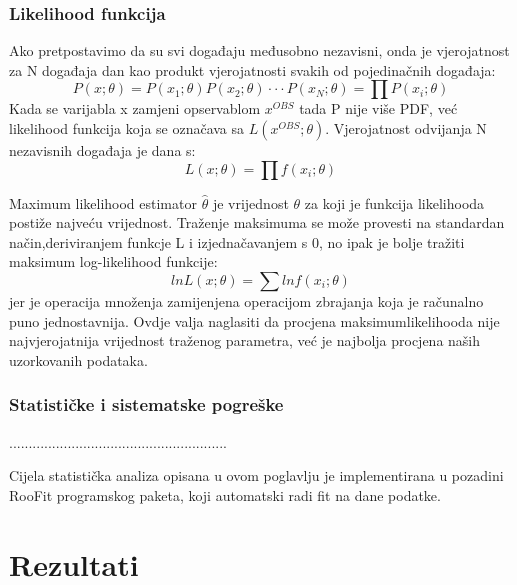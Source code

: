 \documentclass[12pt,a4paper,oneside]{article}
\begin{document}
\begin{linenumbers}
		\subsubsection{Likelihood funkcija}
		Ako pretpostavimo da su svi događaju međusobno nezavisni, onda je vjerojatnost za N događaja dan kao produkt vjerojatnosti svakih od pojedinačnih događaja:
		\begin{equation}
		P(x;\theta) = P(x_1 ; \theta) P(x_2 ; \theta) \cdot \cdot \cdot P(x_N ; \theta) = \prod P(x_i ; \theta)
		\end{equation}
		Kada se varijabla x zamjeni opservablom \begin{math}
		x^{OBS}
		\end{math} tada P nije više PDF, već likelihood funkcija  koja se označava sa \begin{math}
		L (x^{OBS}; \theta)
		\end{math}. Vjerojatnost odvijanja N nezavisnih događaja je dana s:
		\begin{equation}
		L(x; \theta) = \prod f(x_i; \theta)
		\end{equation}
		
		Maximum likelihood estimator \begin{math}
		\hat{\theta}
		\end{math} je vrijednost $\theta$ za koji je funkcija likelihooda postiže najveću vrijednost. Traženje maksimuma se može provesti na standardan način,deriviranjem funkcje L i izjednačavanjem s 0, no ipak je bolje tražiti maksimum log-likelihood funkcije:
		 \begin{equation}
		 ln L(x; \theta) = \sum ln f(x_i; \theta)
		 \end{equation}
		 jer je operacija množenja zamijenjena operacijom zbrajanja koja je računalno puno jednostavnija.
		 Ovdje valja naglasiti da procjena maksimumlikelihooda nije najvjerojatnija vrijednost traženog parametra, već je najbolja procjena naših uzorkovanih podataka.
		
		\subsubsection{Statističke i sistematske pogreške}
		........................................................
		
		
		Cijela statistička analiza opisana u ovom poglavlju je implementirana u pozadini RooFit programskog paketa, koji automatski radi fit na dane podatke.
		
		\newpage
		\section{Rezultati}

\end{linenumbers}
\end{document}
